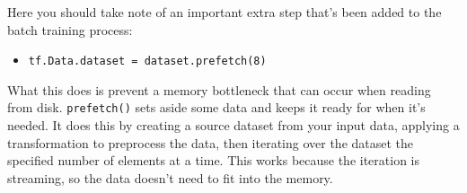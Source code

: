 \documentclass[11pt]{article}
\providecommand{\tightlist}{%
      \setlength{\itemsep}{0pt}\setlength{\parskip}{0pt}}
\begin{document}
Here you should take note of an important extra step that's been added
to the batch training process:

\begin{itemize}
\tightlist
\item
  \texttt{tf.Data.dataset\ =\ dataset.prefetch(8)}
\end{itemize}

What this does is prevent a memory bottleneck that can occur when
reading from disk. \texttt{prefetch()} sets aside some data and keeps it
ready for when it's needed. It does this by creating a source dataset
from your input data, applying a transformation to preprocess the data,
then iterating over the dataset the specified number of elements at a
time. This works because the iteration is streaming, so the data doesn't
need to fit into the memory.
\end{document}
